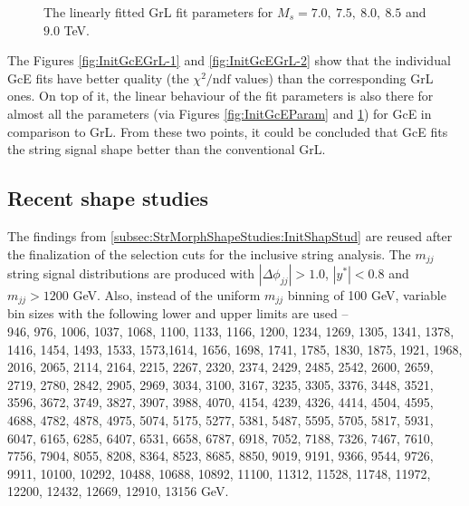 \begin{figure}[!htb]
  \caption{The linearly fitted GrL fit parameters for $M_{s} = 7.0,~7.5,~8.0,~8.5$ and $9.0$ TeV.}
  \label{fig:InitGrLParam}
\end{figure}


The Figures \ref{fig:InitGcEGrL-1} and \ref{fig:InitGcEGrL-2} show that the individual GcE fits have better quality (the $\chi^2/\mathrm{ndf}$ values) than the corresponding GrL ones. On top of it, the linear behaviour of the fit parameters is also there for almost all the parameters (via Figures \ref{fig:InitGcEParam} and \ref{fig:InitGrLParam}) for GcE in comparison to GrL. From these two points, it could be concluded that GcE fits the string signal shape better than the conventional GrL. 
 

\subsection{Recent shape studies}
\label{subsec:StrMorphShapeStudies:ReceShapStud}
The findings from \ref{subsec:StrMorphShapeStudies:InitShapStud} are reused after the finalization of the selection cuts for the inclusive string analysis. The $m_{jj}$ string signal distributions are produced with $|\Delta\phi_{jj}|>1.0$, $|y^*|<0.8$ and $m_{jj}>1200$ GeV. Also, instead of the uniform $m_{jj}$ binning of 100 GeV, variable bin sizes with the following lower and upper limits are used -- \\

946, 976, 1006, 1037, 1068, 1100, 1133, 1166, 1200, 1234, 1269, 1305, 1341, 1378, 1416, 1454, 1493, 1533, 1573,1614, 1656, 1698, 1741, 1785, 1830, 1875, 1921, 1968, 2016, 2065, 2114, 2164, 2215, 2267, 2320, 2374, 2429, 2485, 2542, 2600, 2659, 2719, 2780, 2842, 2905, 2969, 3034, 3100, 3167, 3235, 3305, 3376, 3448, 3521, 3596, 3672, 3749, 3827, 3907, 3988, 4070, 4154, 4239, 4326, 4414, 4504, 4595, 4688, 4782, 4878, 4975, 5074, 5175, 5277, 5381, 5487, 5595, 5705, 5817, 5931, 6047, 6165, 6285, 6407, 6531, 6658, 6787, 6918, 7052, 7188, 7326, 7467, 7610, 7756, 7904, 8055, 8208, 8364, 8523, 8685, 8850, 9019, 9191, 9366, 9544, 9726, 9911, 10100, 10292, 10488, 10688, 10892, 11100, 11312, 11528, 11748, 11972, 12200, 12432, 12669, 12910, 13156 GeV.
   
